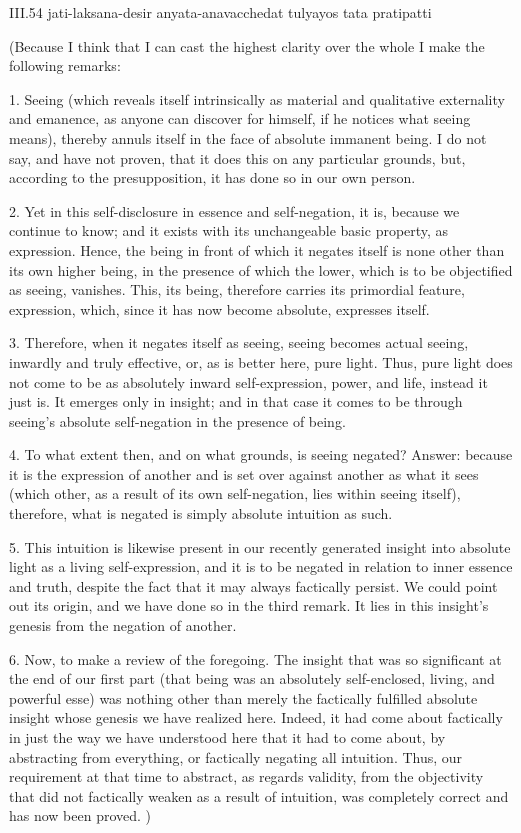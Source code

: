 III.54
jati-laksana-desir anyata-anavacchedat tulyayos tata pratipatti

(Because I think that I can cast
the highest clarity over the whole
I make the following remarks:

1. Seeing
(which reveals itself intrinsically
as material and qualitative externality and emanence,
as anyone can discover for himself,
if he notices what seeing means),
thereby annuls itself in the face
of absolute immanent being.
I do not say, and have not proven,
that it does this on any particular grounds,
but, according to the presupposition,
it has done so in our own person.

2.  Yet in this self-disclosure
in essence and self-negation,
it is, because we continue to know;
and it exists with its unchangeable basic property,
as expression.
Hence, the being in front of which
it negates itself is none other
than its own higher being,
in the presence of which the lower,
which is to be objectified as seeing, vanishes.
This, its being, therefore carries its
primordial feature, expression,
which, since it has now become absolute,
expresses itself.

3. Therefore, when it negates itself as seeing,
seeing becomes actual seeing,
inwardly and truly effective,
or, as is better here, pure light.
Thus, pure light does not come to be as
absolutely inward self-expression, power, and life,
instead it just is.
It emerges only in insight;
and in that case it comes to be
through seeing’s absolute self-negation
in the presence of being.

4. To what extent then,
and on what grounds,
is seeing negated?
Answer: because it is the expression of another
and is set over against another as what it sees
(which other, as a result of its own self-negation,
lies within seeing itself),
therefore, what is negated
is simply absolute intuition as such.

5. This intuition is likewise present
in our recently generated insight into
absolute light as a living self-expression,
and it is to be negated in relation to
inner essence and truth,
despite the fact that it may
always factically persist.
We could point out its origin,
and we have done so in the third remark.
It lies in this insight’s genesis
from the negation of another.

6. Now, to make a review of the foregoing.
The insight that was so significant
at the end of our first part
(that being was an absolutely
self-enclosed, living, and powerful esse)
was nothing other than merely
the factically fulfilled absolute insight
whose genesis we have realized here.
Indeed, it had come about factically
in just the way we have understood
here that it had to come about,
by abstracting from everything,
or factically negating all intuition.
Thus, our requirement at that time to abstract,
as regards validity, from the objectivity
that did not factically weaken as a result of intuition,
was completely correct and has now been proved.
)

